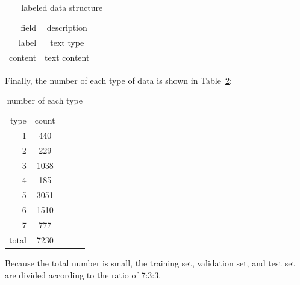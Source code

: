 \documentclass[10pt,twocolumn,letterpaper]{article}
\begin{document}
    \begin{table}
    \newcommand{\tabincell}[2]{\begin{tabular}{@{}#1@{}}#2\end{tabular}}
    \begin{center}
    \caption{labeled data structure}
    \vspace{0.5cm}
    \label{struct}
    \begin{tabular}{rcccc}
    \hline\noalign{\smallskip}
    field & description\\
    \noalign{\smallskip}
    \hline
    \noalign{\smallskip}
    label & text type\\
    content & text content\\
    \hline
    \end{tabular}
    \end{center}
    \end{table}
    \setlength{\tabcolsep}{1.4pt}
    Finally, the number of each type of data is shown in Table~\ref{totalnumber}:
    \setlength{\tabcolsep}{40pt}
    \begin{table}
    \newcommand{\tabincell}[2]{\begin{tabular}{@{}#1@{}}#2\end{tabular}}
    \begin{center}
    \caption{number of each type}
    \vspace{0.5cm}
    \label{totalnumber}
    \begin{tabular}{rcccc}
    \hline\noalign{\smallskip}
    type & count\\
    \noalign{\smallskip}
    \hline
    \noalign{\smallskip}
    1 & 440\\
    2 & 229\\
    3 & 1038\\
    4 & 185\\
    5 & 3051\\
    6 & 1510\\
    7 & 777\\
    total & 7230\\
    \hline
    \end{tabular}
    \end{center}
    \end{table}
    \setlength{\tabcolsep}{1.4pt}
    Because the total number is small, the training set, validation set, and test set are divided according to the ratio of 7:3:3.
\end{document}

